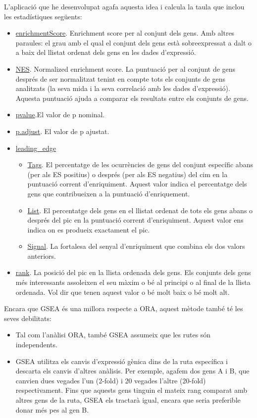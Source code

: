 L'aplicació que he desenvolupat agafa aquesta idea i calcula la taula que inclou les estadístiques següents:

\begin{itemize}
\item \underline{enrichmentScore}. Enrichment score per al conjunt dels gens. Amb altres paraules: el grau amb el qual el conjunt dels gens està sobreexpressat a dalt o a baix del llistat ordenat dels gens en les dades d'expressió.
\item \underline{NES}. Normalized enrichment score. La puntuació per al conjunt de gens després de ser normalitzat tenint en compte tots els conjunts de gens analitzats (la seva mida i la seva correlació amb les dades d'expressió). Aquesta puntuació ajuda a comparar els resultats entre els conjunts de gens.
\item \underline{pvalue}.El valor de p nominal.
\item \underline{p.adjust}. El valor de p ajustat.
\item \underline{leading\_edge}
\begin{itemize}
\item \underline{Tags}. El percentatge de les ocurrències de gens del conjunt específic abans (per als ES positius) o després (per als ES negatius) del cim en la puntuació corrent d'enriquiment. Aquest valor indica el percentatge dels gens que contribueixen a la puntuació d'enriquement. 
\item \underline{List}. El percentatge dels gens en el llistat ordenat de tots els gens abans o després del pic en la puntuació corrent d'enriquiment. Aquest valor ens indica on es produeix exactament el pic. 
\item \underline{Signal}. La fortalesa del senyal d'enriquiment que combina els dos valors anteriors.
\end{itemize}
\item \underline{rank}. La posició del pic en la llista ordenada dels gens. Els conjunts dels gens més interessants assoleixen el seu màxim o bé al principi o al final de la llista ordenada. Vol dir que tenen aquest valor o bé molt baix o bé molt alt.
\end{itemize}

Encara que GSEA és una millora respecte a ORA, aquest mètode també té les seves debilitats: 
\begin{itemize}
\item	Tal com l’anàlisi ORA, també GSEA assumeix que les rutes són independents.
\item	GSEA utilitza els canvis d’expressió gènica dins de la ruta específica i descarta els canvis d’altres anàlisis. Per exemple, agafem dos gens A i B, que canvien dues vegades l’un (2-fold) i 20 vegades l’altre (20-fold) respectivament. Fins que aquests gens tinguin el mateix rang comparat amb altres gens de la ruta, GSEA els tractarà igual, encara que seria preferible donar més pes al gen B.
\end{itemize}

